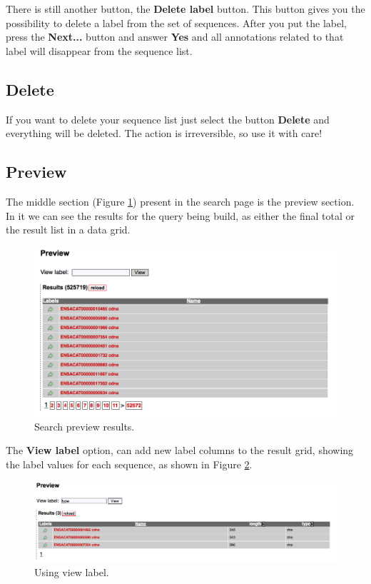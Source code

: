 There is still another button, the \textbf{Delete label} button. This button gives you the possibility
to delete a label from the set of sequences. After you put the label, press the \textbf{Next...} button and
answer \textbf{Yes} and all annotations related to that label will disappear from the sequence list.

\subsection{Delete}

If you want to delete your sequence list just select the button \textbf{Delete} and
everything will be deleted. The action is irreversible, so use it with care!

\subsection{Preview}

The middle section (Figure \ref{fig:search3_man}) present in the search page is the preview section. In it
we can see the results for the query being build, as either the final total or the result list in a data grid.

\begin{figure}[H]
  \centering
    \includegraphics[scale=0.5]{search3.png}
  \caption{Search preview results.}
  \label{fig:search3_man}
\end{figure}

The \textbf{View label} option, can add new label columns to the result grid, showing the label
values for each sequence, as shown in Figure \ref{fig:view_label}.

\begin{figure}[H]
  \centering
    \includegraphics[scale=0.5]{view_label.png}
  \caption{Using view label.}
  \label{fig:view_label}
\end{figure}

